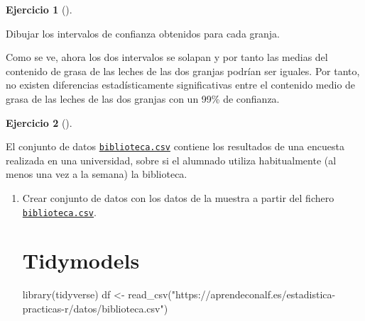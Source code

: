 \documentclass[
  a4paper,
]{scrreport}
\newenvironment{Shaded}{\begin{snugshade}}{\end{snugshade}}
\newcommand{\ExtensionTok}[1]{\textcolor[rgb]{0.00,0.23,0.31}{#1}}
\newcommand{\FunctionTok}[1]{\textcolor[rgb]{0.28,0.35,0.67}{#1}}
\newcommand{\NormalTok}[1]{\textcolor[rgb]{0.00,0.23,0.31}{#1}}
\newcommand{\OtherTok}[1]{\textcolor[rgb]{0.00,0.23,0.31}{#1}}
\newcommand{\StringTok}[1]{\textcolor[rgb]{0.13,0.47,0.30}{#1}}
\theoremstyle{definition}
\newtheorem{exercise}{Ejercicio}[chapter]
\theoremstyle{remark}
\begin{document}
\begin{exercise}[]
\begin{enumerate}
\begin{tcolorbox}
\begin{Shaded}
\begin{Highlighting}[]
\ExtensionTok{Dibujar}\NormalTok{ los intervalos de confianza obtenidos para cada granja.}
\end{Highlighting}
\end{Shaded}

  Como se ve, ahora los dos intervalos se solapan y por tanto las medias
  del contenido de grasa de las leches de las dos granjas podrían ser
  iguales. Por tanto, no existen diferencias estadísticamente
  significativas entre el contenido medio de grasa de las leches de las
  dos granjas con un 99\% de confianza.

  \end{tcolorbox}
\end{enumerate}

\end{exercise}

\begin{exercise}[]\protect\hypertarget{exr-uso-biblioteca}{}\label{exr-uso-biblioteca}

El conjunto de datos
\href{https://aprendeconalf.es/estadistica-practicas-r/datos/biblioteca.csv}{\texttt{biblioteca.csv}}
contiene los resultados de una encuesta realizada en una universidad,
sobre si el alumnado utiliza habitualmente (al menos una vez a la
semana) la biblioteca.

\begin{enumerate}
\def\labelenumi{\alph{enumi}.}
\item
  Crear conjunto de datos con los datos de la muestra a partir del
  fichero
  \href{https://aprendeconalf.es/estadistica-practicas-r/datos/biblioteca.csv}{\texttt{biblioteca.csv}}.

  \begin{tcolorbox}[enhanced jigsaw, colframe=quarto-callout-tip-color-frame, toprule=.15mm, bottomtitle=1mm, breakable, opacitybacktitle=0.6, toptitle=1mm, colback=white, bottomrule=.15mm, title=\textcolor{quarto-callout-tip-color}{\faLightbulb}\hspace{0.5em}{Solución}, arc=.35mm, left=2mm, titlerule=0mm, rightrule=.15mm, coltitle=black, leftrule=.75mm, opacityback=0, colbacktitle=quarto-callout-tip-color!10!white]

  \section{Tidymodels}

\begin{Shaded}
\begin{Highlighting}[]
\FunctionTok{library}\NormalTok{(tidyverse)}
\NormalTok{df }\OtherTok{\textless{}{-}} \FunctionTok{read\_csv}\NormalTok{(}\StringTok{"https://aprendeconalf.es/estadistica{-}practicas{-}r/datos/biblioteca.csv"}\NormalTok{)}
\end{Highlighting}
\end{Shaded}


\end{tcolorbox}
\end{enumerate}
\end{exercise}
\end{document}
